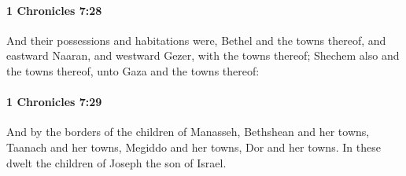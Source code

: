 		\paragraph{1 Chronicles 7:28} %
			\label{1CHRONICLES-7-28}

			And their possessions and habitations were, Bethel and the towns thereof, and eastward Naaran, and westward Gezer, with the towns thereof; Shechem also and the towns thereof, unto Gaza and the towns thereof:


		\paragraph{1 Chronicles 7:29} %
			\label{1CHRONICLES-7-29}

			And by the borders of the children of Manasseh, Bethshean and her towns, Taanach and her towns, Megiddo and her towns, Dor and her towns. In these dwelt the children of Joseph the son of Israel.

